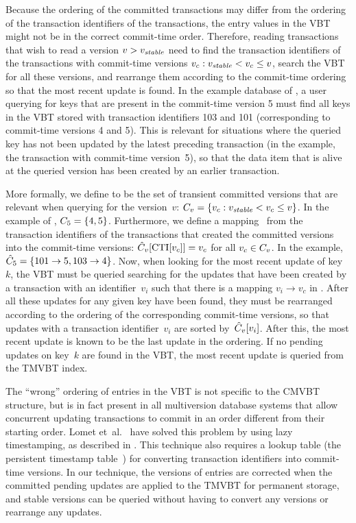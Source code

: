 Because the ordering of the committed transactions may differ from
the ordering of the transaction identifiers of the transactions, the
entry values in the VBT might not be in the correct commit-time order.
Therefore, reading transactions that wish to read a version $v >
\smash{v_{\text{\textit{stable}}}}$ need to find the transaction identifiers of the
transactions with commit-time versions $v_c: \smash{v_{\text{\textit{stable}}}} < v_c
\leq v$, search the VBT for all these versions, and rearrange them according
to the commit-time ordering so that the most recent update is found.
In the example database of , a user
querying for keys that are present in the commit-time version \num{5} must
find all keys in the VBT stored with transaction identifiers \num{103} and
\num{101} (corresponding to commit-time versions \num{4} and \num{5}). 
This is relevant for situations where the queried key has not been updated by
the latest preceding transaction (in the example, the transaction with
commit-time version~\num{5}), so that the data item that is alive at the
queried version has been created by an earlier transaction.

More formally, we define  to be the set of transient committed
versions that are relevant when querying for the version~$v$:
$C_{v} = \{ v_c : \smash{v_{\text{\textit{stable}}}} < v_c \leq v \}$. 
In the example of , $C_{5} = \{4, 5\}$. 
Furthermore, we define a mapping~ from the transaction
identifiers of the transactions that created the committed versions into the
commit-time versions:
$\smash{\hat{C}_{v}}[\text{CTI}[v_c]] = v_c$ for all $v_c \in C_{v}$. 
In the example, $\smash{\hat{C}_{5}} = \{101 \to 5, 103 \to 4\}$.
Now, when looking for the most recent update of key~$k$, the VBT must be
queried searching for the updates that have been created by a transaction
with an identifier~$v_i$ such that there is a mapping $v_i \to v_c$ in
. 
After all these updates for any given key have been found, they
must be rearranged according to the ordering of the corresponding
commit-time versions, so that updates with a transaction identifier~$v_i$ are
sorted by~$\smash{\hat{C}_{v}}[v_i]$.
After this, the most recent update is known to be the last update in the
ordering. 
If no pending updates on key~$k$ are found in the VBT, the most recent update
is queried from the TMVBT index.

The ``wrong'' ordering of entries in the VBT is not specific to the CMVBT
structure, but is in fact present in all multiversion database systems that
allow concurrent updating transactions to commit in an order different
from their starting order.
Lomet et~al.~\cite{lomet:2006:transactiontime} have solved this
problem by using lazy timestamping, as described in .
This technique also requires a lookup table (the persistent timestamp
table~\cite{lomet:2006:transactiontime,lomet:2009:improving}) for converting
transaction identifiers into commit-time versions. 
In our technique, the versions of entries are corrected when the
committed pending updates are applied to the TMVBT for permanent storage, and
stable versions can be queried without having to convert any versions or
rearrange any updates.



